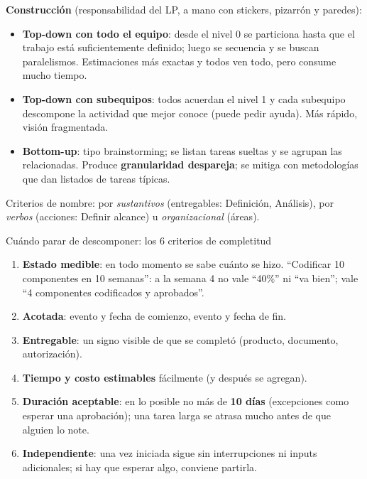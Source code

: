 \documentclass[11pt,a4paper]{article}
\begin{document}
\textbf{Construcción} (responsabilidad del LP, a mano con stickers, pizarrón y paredes):
\begin{itemize}
  \item \textbf{Top-down con todo el equipo}: desde el nivel 0 se particiona hasta que el trabajo está
  suficientemente definido; luego se secuencia y se buscan paralelismos. Estimaciones más exactas y todos ven
  todo, pero consume mucho tiempo.
  \item \textbf{Top-down con subequipos}: todos acuerdan el nivel 1 y cada subequipo descompone la actividad
  que mejor conoce (puede pedir ayuda). Más rápido, visión fragmentada.
  \item \textbf{Bottom-up}: tipo brainstorming; se listan tareas sueltas y se agrupan las relacionadas. Produce
  \textbf{granularidad despareja}; se mitiga con metodologías que dan listados de tareas típicas.
\end{itemize}
Criterios de nombre: por \emph{sustantivos} (entregables: Definición, Análisis), por \emph{verbos} (acciones:
Definir alcance) u \emph{organizacional} (áreas).

\begin{defbox}{Cuándo parar de descomponer: los 6 criterios de completitud}
\begin{enumerate}
  \item \textbf{Estado medible}: en todo momento se sabe cuánto se hizo. ``Codificar 10 componentes en 10
  semanas'': a la semana 4 no vale ``40\%'' ni ``va bien''; vale ``4 componentes codificados y aprobados''.
  \item \textbf{Acotada}: evento y fecha de comienzo, evento y fecha de fin.
  \item \textbf{Entregable}: un signo visible de que se completó (producto, documento, autorización).
  \item \textbf{Tiempo y costo estimables} fácilmente (y después se agregan).
  \item \textbf{Duración aceptable}: en lo posible no más de \textbf{10 días} (excepciones como esperar una
  aprobación); una tarea larga se atrasa mucho antes de que alguien lo note.
  \item \textbf{Independiente}: una vez iniciada sigue sin interrupciones ni inputs adicionales; si hay que
  esperar algo, conviene partirla.
\end{enumerate}
\end{defbox}
\end{document}
